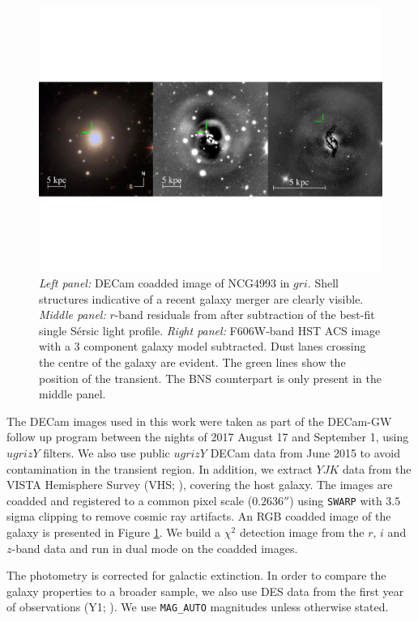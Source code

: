 \begin{figure}
\centering
\includegraphics[width=1\textwidth]{./chapters/chapter3/Figures/f1.pdf}
\caption{\emph{Left panel:} DECam coadded image of NCG4993 in $gri$. Shell structures indicative of a recent galaxy merger are clearly visible. \emph{Middle panel:} $r$-band residuals from \galfit after subtraction of the best-fit single S\'ersic light profile. \emph{Right panel:} F606W-band HST ACS image with a 3 component galaxy model subtracted. Dust lanes crossing the centre of the galaxy are evident. The green lines show the position of the transient. The BNS counterpart is only present in the middle panel.
}\label{coaddimage}\end{figure}

The DECam images used in this work were taken as part of the DECam-GW follow up program between the nights of 2017 August 17 and September 1, using $ugrizY$ filters. We also use public $ugrizY$ DECam data from June 2015 to avoid contamination in the transient region. In addition, we extract $YJK$ data from the VISTA Hemisphere Survey (VHS; \citealt{vista}), covering the host galaxy.
The images are coadded and registered to a common pixel scale ($0.2636''$) using \texttt{SWARP} \citep{swarpref} with $3.5$ sigma clipping to remove cosmic ray artifacts. An RGB coadded image of the galaxy is presented in Figure \ref{coaddimage}. We build a $\chi^2$ detection image from the $r$, $i$ and $z$-band data and run \sextractor \citep{sextractor} in dual mode on the coadded images. 

The photometry is corrected for galactic extinction. 
In order to compare the galaxy properties to a broader sample, we also use DES data from the first year of observations (Y1; \citealt{firstyear}).
We use \texttt{MAG\_AUTO} magnitudes unless otherwise stated.

